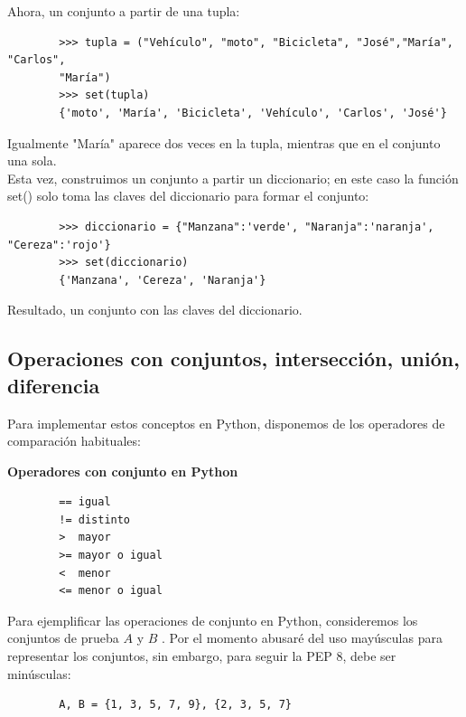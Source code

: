	Ahora, un conjunto a partir de una tupla:
	\begin{lstlisting}
		>>> tupla = ("Vehículo", "moto", "Bicicleta", "José","María", "Carlos",
		"María")
		>>> set(tupla)
		{'moto', 'María', 'Bicicleta', 'Vehículo', 'Carlos', 'José'}
	\end{lstlisting}
	Igualmente  "María{}"{} aparece dos veces en la tupla, mientras que en el conjunto una sola.\\ 
	
	
	Esta vez, construimos un conjunto a partir un diccionario; en este caso la función {\ttfamily set()} solo toma las claves del diccionario para formar el conjunto:
	\begin{lstlisting}
		>>> diccionario = {"Manzana":'verde', "Naranja":'naranja', "Cereza":'rojo'}
		>>> set(diccionario)
		{'Manzana', 'Cereza', 'Naranja'}
	\end{lstlisting}
	\noindent Resultado, un conjunto con las claves del diccionario.
	
	\subsection{Operaciones con conjuntos, intersección, unión, diferencia}
	
	Para implementar estos conceptos en Python, disponemos de los operadores de comparación habituales:\vspace{0.2cm}
	
	{\bf Operadores con conjunto en Python}
	\begin{lstlisting}
		== igual
		!= distinto
		>  mayor
		>= mayor o igual
		<  menor
		<= menor o igual
	\end{lstlisting}
	
	
	
	
	
	Para ejemplificar las operaciones de conjunto en Python, consideremos los conjuntos de prueba {\ttfamily $A$ } y {\ttfamily $B$ }. Por el momento abusaré del uso mayúsculas para representar los conjuntos, sin embargo, para seguir la PEP 8, debe ser minúsculas:
	
	
	\hspace{-2.7cm}{\ttfamily \scriptsize conjuntos.py}  \vspace{-0.5cm}
	\begin{lstlisting}		
		A, B = {1, 3, 5, 7, 9}, {2, 3, 5, 7}
	\end{lstlisting}
	

